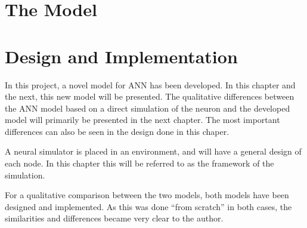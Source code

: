 \documentclass[a4paper,11 pt]{report}
\begin{document}





\chapter{The Model} 				%


\chapter{Design and Implementation} %
	In this project, a novel model for ANN has been developed.  %
	In this chapter and the next, this new model will be presented.  %
	The qualitative differences between the ANN model based on a direct simulation of the neuron and the developed model will primarily be presented in the next chapter.
	The most important differences can also be seen in the design done in this chaper. %

	A neural simulator is placed in an environment, and will have a general design of each node. 
	In this chapter this will be referred to as the framework of the simulation.
	
	For a qualitative comparison between the two models, both models have been designed and implemented. %
	As this was done ``from scratch'' in both cases, the similarities and differences became very clear to the author. %
\end{document}
